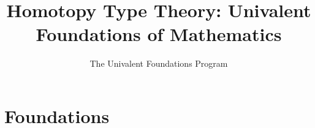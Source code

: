 \documentclass[\OPTfontsize]{book}
\begin{document}
\title{Homotopy Type Theory: Univalent Foundations of Mathematics}
\author{The Univalent Foundations Program}


\frontmatter %

\pagestyle{empty}


\cleartooddpage

\hypertarget{preface}{}
\ifOPTchinese
{}
\else
{}
\fi

\pagestyle{fancyplain}

\ifOPTchinese

\else

\fi

\cleartooddpage[\thispagestyle{empty}]

\hypertarget{toc}{}

\setcounter{tocdepth}{1}        %
\tableofcontents
\setcounter{tocdepth}{2}        %
\cleartooddpage[\thispagestyle{empty}]

\mainmatter %

\pagestyle{fancyplain}

\ifOPTchinese

\else

\fi

\part{Foundations}
\label{part:foundations}















\cleartooddpage[\thispagestyle{empty}] %
\end{document}
